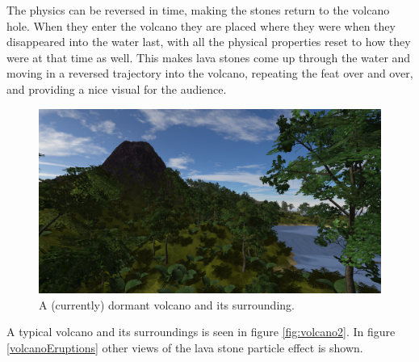 The physics can be reversed in time, making the stones return to the volcano hole. When they enter the volcano they are placed where they were when they disappeared into the water last, with all the physical properties reset to how they were at that time as well. This makes lava stones come up through the water and moving in a reversed trajectory into the volcano, repeating the feat over and over, and providing a nice visual for the audience.

\begin{figure}[H]
  \centering
  \includegraphics[width=0.9\linewidth]{images/volcano3.jpg}
  \caption{A (currently) dormant volcano and its surrounding.}
  \label{fig:vulcano2}
\end{figure}%

A typical volcano and its surroundings is seen in figure \ref{fig:volcano2}. In figure \ref{volcanoEruptions} other views of the lava stone particle effect is shown.

